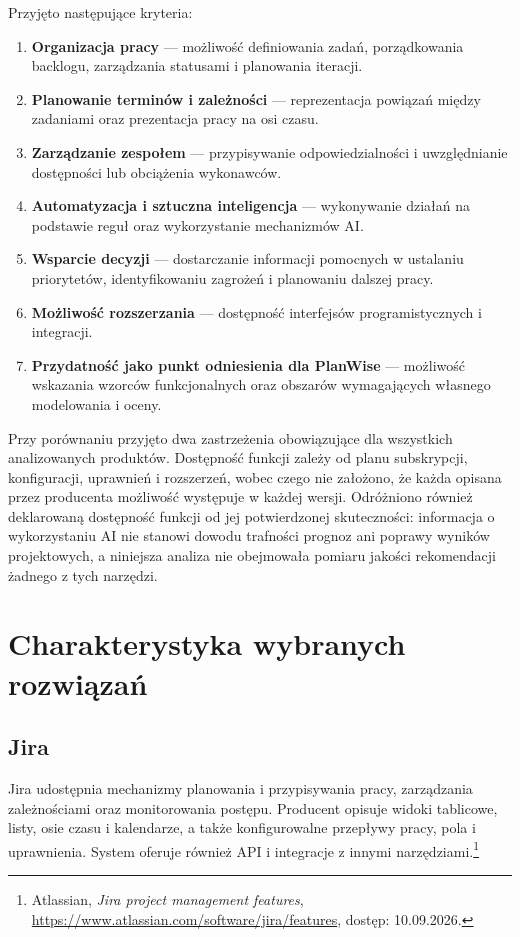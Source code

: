 Przyjęto następujące kryteria:
\begin{enumerate}
    \item \textbf{Organizacja pracy} --- możliwość definiowania zadań, porządkowania backlogu, zarządzania statusami i planowania iteracji.
    \item \textbf{Planowanie terminów i zależności} --- reprezentacja powiązań między zadaniami oraz prezentacja pracy na osi czasu.
    \item \textbf{Zarządzanie zespołem} --- przypisywanie odpowiedzialności i uwzględnianie dostępności lub obciążenia wykonawców.
    \item \textbf{Automatyzacja i sztuczna inteligencja} --- wykonywanie działań na podstawie reguł oraz wykorzystanie mechanizmów AI.
    \item \textbf{Wsparcie decyzji} --- dostarczanie informacji pomocnych w ustalaniu priorytetów, identyfikowaniu zagrożeń i planowaniu dalszej pracy.
    \item \textbf{Możliwość rozszerzania} --- dostępność interfejsów programistycznych i integracji.
    \item \textbf{Przydatność jako punkt odniesienia dla PlanWise} --- możliwość wskazania wzorców funkcjonalnych oraz obszarów wymagających własnego modelowania i oceny.
\end{enumerate}

Przy porównaniu przyjęto dwa zastrzeżenia obowiązujące dla wszystkich analizowanych produktów. Dostępność funkcji zależy od planu subskrypcji, konfiguracji, uprawnień i rozszerzeń, wobec czego nie założono, że każda opisana przez producenta możliwość występuje w każdej wersji. Odróżniono również deklarowaną dostępność funkcji od jej potwierdzonej skuteczności: informacja o wykorzystaniu AI nie stanowi dowodu trafności prognoz ani poprawy wyników projektowych, a niniejsza analiza nie obejmowała pomiaru jakości rekomendacji żadnego z tych narzędzi.


\section{Charakterystyka wybranych rozwiązań}
\label{sec:charakterystyka-rozwiazan}

\subsection{Jira}
\label{subsec:jira}

Jira udostępnia mechanizmy planowania i przypisywania pracy, zarządzania zależnościami oraz monitorowania postępu. Producent opisuje widoki tablicowe, listy, osie czasu i kalendarze, a także konfigurowalne przepływy pracy, pola i uprawnienia. System oferuje również API i integracje z innymi narzędziami.\footnote{Atlassian, \textit{Jira project management features}, \url{https://www.atlassian.com/software/jira/features}, dostęp: 10.09.2026.}

